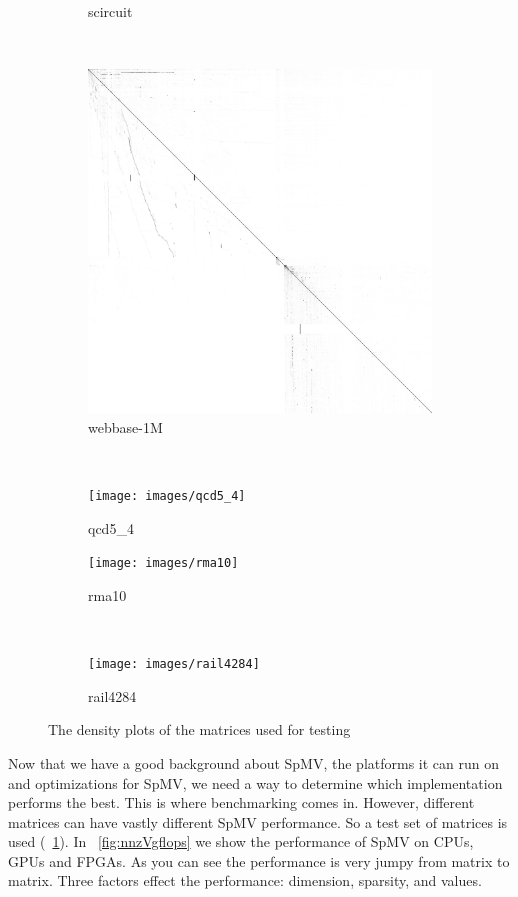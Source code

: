 \begin{figure}
\begin{multicols}{4}
\begin{subfigure}{\linewidth}
\caption{scircuit}
\end{subfigure}~%
\begin{subfigure}{\linewidth}
\includegraphics[width=\linewidth]{images/webbase-1M}
\caption{webbase-1M}
\end{subfigure}~%
\begin{subfigure}{\linewidth}
    \texttt{[image: images/qcd5\_4]}
    \caption{qcd5\_4}
\end{subfigure}
\end{multicols}
\begin{multicols}{4}
\begin{subfigure}{\linewidth}
    \texttt{[image: images/rma10]}
    \caption{rma10}
\end{subfigure}~%
\begin{subfigure}{\linewidth}
    \texttt{[image: images/rail4284]}
    \caption{rail4284}
\end{subfigure}
\end{multicols}

\caption[The benchmark matrices.]{The density plots of the matrices used for testing}
\label{fig:matrices}
\end{figure}
Now that we have a good background about SpMV, the platforms it can run on and optimizations for SpMV, we need a way to determine which implementation performs the best. This is where benchmarking comes in. However, different matrices can have vastly different SpMV performance. So a test set of matrices is used (\figurename~\ref{fig:matrices}). In \figurename~\ref{fig:nnzVgflops} we show the performance of SpMV on CPUs, GPUs and FPGAs. As you can see the performance is very jumpy from matrix to matrix. Three factors effect the performance: dimension, sparsity, and values. \par

